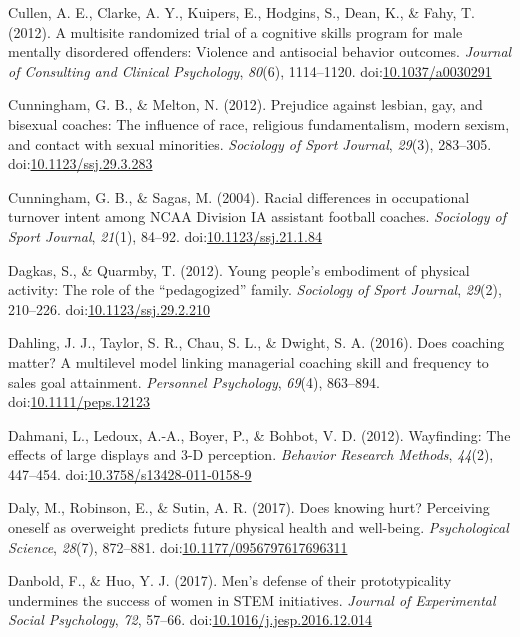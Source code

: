 \documentclass[english,man]{apa6}
\theoremstyle{definition}
\theoremstyle{definition}
\theoremstyle{definition}
\theoremstyle{remark}
\begin{document}
\hypertarget{ref-Cullen2012}{}
Cullen, A. E., Clarke, A. Y., Kuipers, E., Hodgins, S., Dean, K., \&
Fahy, T. (2012). A multisite randomized trial of a cognitive skills
program for male mentally disordered offenders: Violence and antisocial
behavior outcomes. \emph{Journal of Consulting and Clinical Psychology},
\emph{80}(6), 1114--1120.
doi:\href{https://doi.org/10.1037/a0030291}{10.1037/a0030291}

\hypertarget{ref-Cunningham2012}{}
Cunningham, G. B., \& Melton, N. (2012). Prejudice against lesbian, gay,
and bisexual coaches: The influence of race, religious fundamentalism,
modern sexism, and contact with sexual minorities. \emph{Sociology of
Sport Journal}, \emph{29}(3), 283--305.
doi:\href{https://doi.org/10.1123/ssj.29.3.283}{10.1123/ssj.29.3.283}

\hypertarget{ref-Cunningham2004}{}
Cunningham, G. B., \& Sagas, M. (2004). Racial differences in
occupational turnover intent among NCAA Division IA assistant football
coaches. \emph{Sociology of Sport Journal}, \emph{21}(1), 84--92.
doi:\href{https://doi.org/10.1123/ssj.21.1.84}{10.1123/ssj.21.1.84}

\hypertarget{ref-Dagkas2012}{}
Dagkas, S., \& Quarmby, T. (2012). Young people's embodiment of physical
activity: The role of the ``pedagogized'' family. \emph{Sociology of
Sport Journal}, \emph{29}(2), 210--226.
doi:\href{https://doi.org/10.1123/ssj.29.2.210}{10.1123/ssj.29.2.210}

\hypertarget{ref-Dahling2016}{}
Dahling, J. J., Taylor, S. R., Chau, S. L., \& Dwight, S. A. (2016).
Does coaching matter? A multilevel model linking managerial coaching
skill and frequency to sales goal attainment. \emph{Personnel
Psychology}, \emph{69}(4), 863--894.
doi:\href{https://doi.org/10.1111/peps.12123}{10.1111/peps.12123}

\hypertarget{ref-Dahmani2012}{}
Dahmani, L., Ledoux, A.-A., Boyer, P., \& Bohbot, V. D. (2012).
Wayfinding: The effects of large displays and 3-D perception.
\emph{Behavior Research Methods}, \emph{44}(2), 447--454.
doi:\href{https://doi.org/10.3758/s13428-011-0158-9}{10.3758/s13428-011-0158-9}

\hypertarget{ref-Daly2017}{}
Daly, M., Robinson, E., \& Sutin, A. R. (2017). Does knowing hurt?
Perceiving oneself as overweight predicts future physical health and
well-being. \emph{Psychological Science}, \emph{28}(7), 872--881.
doi:\href{https://doi.org/10.1177/0956797617696311}{10.1177/0956797617696311}

\hypertarget{ref-Danbold2017}{}
Danbold, F., \& Huo, Y. J. (2017). Men's defense of their
prototypicality undermines the success of women in STEM initiatives.
\emph{Journal of Experimental Social Psychology}, \emph{72}, 57--66.
doi:\href{https://doi.org/10.1016/j.jesp.2016.12.014}{10.1016/j.jesp.2016.12.014}
\end{document}
